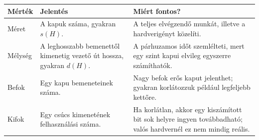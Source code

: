 \begin{tabularx}{\textwidth}{L{30mm}L{30mm}X}
\toprule
\textbf{Mérték} & \textbf{Jelentés} & \textbf{Miért fontos?} \\
\midrule
Méret & A kapuk száma, gyakran $s(H)$. & A teljes elvégzendő munkát, illetve a hardverigényt közelíti. \\
Mélység & A leghosszabb bemenettől kimenetig vezető út hossza, gyakran $d(H)$. & A párhuzamos időt szemlélteti, mert egy szint kapui elvileg egyszerre számíthatók. \\
Befok & Egy kapu bemeneteinek száma. & Nagy befok erős kaput jelenthet; gyakran korlátozzuk például legfeljebb kettőre. \\
Kifok & Egy csúcs kimenetének felhasználási száma. & Ha korlátlan, akkor egy kiszámított bit sok helyre ingyen továbbadható; valós hardvernél ez nem mindig reális. \\
\bottomrule
\end{tabularx}
